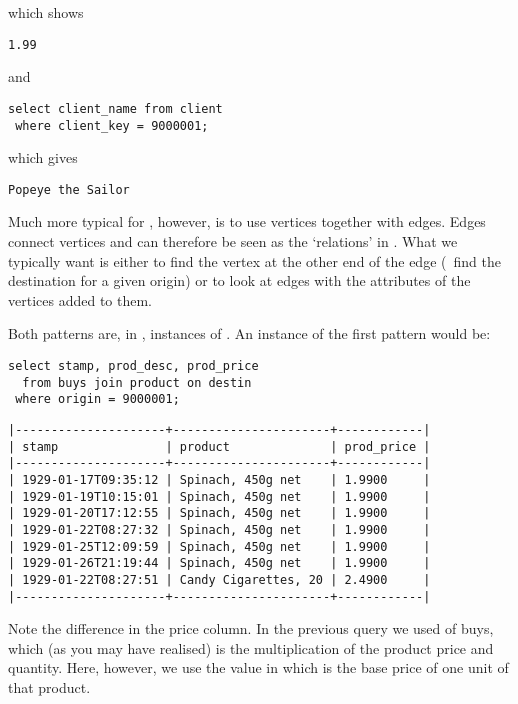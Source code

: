 which shows
\begin{verbatim}
1.99
\end{verbatim}

and

\begin{sqlcode}
\begin{lstlisting}
select client_name from client
 where client_key = 9000001;
\end{lstlisting}
\end{sqlcode}

which gives
\begin{verbatim}
Popeye the Sailor
\end{verbatim}

Much more typical for \nowdb, however,
is to use vertices together with edges. Edges connect vertices
and can therefore be seen as the `relations' in \nowdb.
What we typically want is either to find the vertex
at the other end of the edge (\eg\ find the destination
for a given origin) or to look at edges with the attributes
of the vertices added to them.

Both patterns are, in \sql, instances of .
An instance of the first pattern would be:

\begin{sqlcode}
\begin{lstlisting}
select stamp, prod_desc, prod_price
  from buys join product on destin
 where origin = 9000001;
\end{lstlisting}
\end{sqlcode}

\begin{minipage}{\textwidth}
\begin{verbatim}
|---------------------+----------------------+------------|
| stamp               | product              | prod_price |
|---------------------+----------------------+------------|
| 1929-01-17T09:35:12 | Spinach, 450g net    | 1.9900     |
| 1929-01-19T10:15:01 | Spinach, 450g net    | 1.9900     |
| 1929-01-20T17:12:55 | Spinach, 450g net    | 1.9900     |
| 1929-01-22T08:27:32 | Spinach, 450g net    | 1.9900     |
| 1929-01-25T12:09:59 | Spinach, 450g net    | 1.9900     |
| 1929-01-26T21:19:44 | Spinach, 450g net    | 1.9900     |
| 1929-01-22T08:27:51 | Candy Cigarettes, 20 | 2.4900     |
|---------------------+----------------------+------------|
\end{verbatim}
\end{minipage}

Note the difference in the price column.
In the previous query we used  of buys,
which (as you may have realised)
is the multiplication of the product price and quantity.
Here, however, we use the value in 
which is the base price of one unit of that product.

